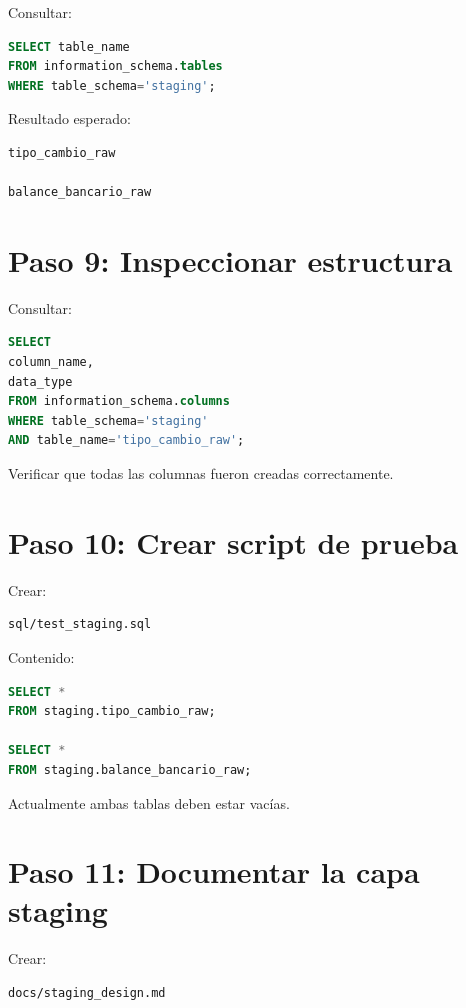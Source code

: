 Consultar:

\begin{lstlisting}[language=SQL]
SELECT table_name
FROM information_schema.tables
WHERE table_schema='staging';
\end{lstlisting}

Resultado esperado:

\begin{verbatim}
tipo_cambio_raw

balance_bancario_raw
\end{verbatim}

\section{Paso 9: Inspeccionar estructura}

Consultar:

\begin{lstlisting}[language=SQL]
SELECT
column_name,
data_type
FROM information_schema.columns
WHERE table_schema='staging'
AND table_name='tipo_cambio_raw';
\end{lstlisting}

Verificar que todas las columnas fueron creadas correctamente.

\section{Paso 10: Crear script de prueba}

Crear:

\begin{verbatim}
sql/test_staging.sql
\end{verbatim}

Contenido:

\begin{lstlisting}[language=SQL]
SELECT *
FROM staging.tipo_cambio_raw;

SELECT *
FROM staging.balance_bancario_raw;
\end{lstlisting}

Actualmente ambas tablas deben estar vacías.

\section{Paso 11: Documentar la capa staging}

Crear:

\begin{verbatim}
docs/staging_design.md
\end{verbatim}

